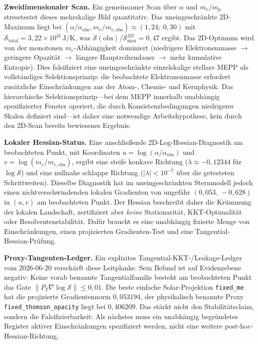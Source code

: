 \documentclass[12pt,a4paper]{article}
\theoremstyle{remark}
\begin{document}
\textbf{Zweidimensionaler Scan.} Ein gemeinsamer Scan \"uber $\alpha$ und $m_e/m_p$ stresstestet dieses mehrskalige Bild quantitativ. Das uneingeschr\"ankte 2D-Maximum liegt bei $(\alpha/\alpha_{\text{obs}}, m_e/m_{e,\text{obs}}) \approx (1{,}24;\; 0{,}30)$ mit $\mathcal{S}_{\text{total}} = 3{,}22 \times 10^{41}\,\text{J/K}$, was $\mathcal{S}(\text{obs})/\mathcal{S}_{\text{max}}^{2D} = 0{,}47$ ergibt. Das 2D-Optimum wird von der monotonen $m_e$-Abh\"angigkeit dominiert (niedrigere Elektronenmasse $\to$ geringere Opazit\"at $\to$ l\"angere Hauptreihendauer $\to$ mehr kumulative Entropie). Dies falsifiziert eine uneingeschr\"ankte einzelskalige stellare MEPP als vollst\"andiges Selektionsprinzip: die beobachtete Elektronenmasse erfordert zus\"atzliche Einschr\"ankungen aus der Atom-, Chemie- und Kernphysik. Das hierarchische Selektionsprinzip---bei dem MEPP innerhalb unabh\"angig spezifizierter Fenster operiert, die durch Konsistenzbedingungen niedrigerer Skalen definiert sind---ist daher eine notwendige Arbeitshypothese, kein durch den 2D-Scan bereits bewiesenes Ergebnis.

\textbf{Lokaler Hessian-Status.} Eine anschlie\ss{}ende 2D-Log-Hessian-Diagnostik am beobachteten Punkt, mit Koordinaten $u=\log(\alpha/\alpha_{\mathrm{obs}})$ und $v=\log(m_e/m_{e,\mathrm{obs}})$, ergibt eine steife konkave Richtung ($\lambda \approx -0{,}12344$ f\"ur $\log \mathcal{S}$) und eine nullnahe schlappe Richtung ($|\lambda|<10^{-7}$ \"uber die getesteten Schrittweiten). Dieselbe Diagnostik hat im uneingeschr\"ankten Sternmodell jedoch einen nichtverschwindenden lokalen Gradienten von ungef\"ahr $(0{,}053,\,-0{,}628)$ in $(u,v)$ am beobachteten Punkt. Der Hessian beschreibt daher die Kr\"ummung der lokalen Landschaft, zertifiziert aber \emph{keine} Stationarit\"at, KKT-Optimalit\"at oder Resolventenstabilit\"at. Daf\"ur braucht es eine unabh\"angig fixierte Menge von Einschr\"ankungen, einen projizierten Gradienten-Test und eine Tangential-Hessian-Pr\"ufung.

\textbf{Proxy-Tangenten-Ledger.} Ein explizites Tangential-KKT-/Leakage-Ledger vom 2026-06-20 versch\"arft diese Leitplanke. Sein Befund ist auf Evidenzebene negativ: Keine vorab benannte Tangentialfamilie besteht am beobachteten Punkt das Gate $\|P_T\nabla \log\mathcal{S}\|\leq 0{,}01$. Die beste einfache Solar-Projektion \texttt{fixed\_me} hat die projizierte Gradientennorm $0{,}053194$, der physikalisch benannte Proxy \texttt{fixed\_thomson\_opacity} liegt bei $0{,}406209$. Das st\"arkt nicht den Stabilit\"atsclaim, sondern die Falsifizierbarkeit: Als n\"achstes muss ein unabh\"angig begr\"undetes Register aktiver Einschr\"ankungen spezifiziert werden, nicht eine weitere post-hoc-Hessian-Richtung.
\end{document}
